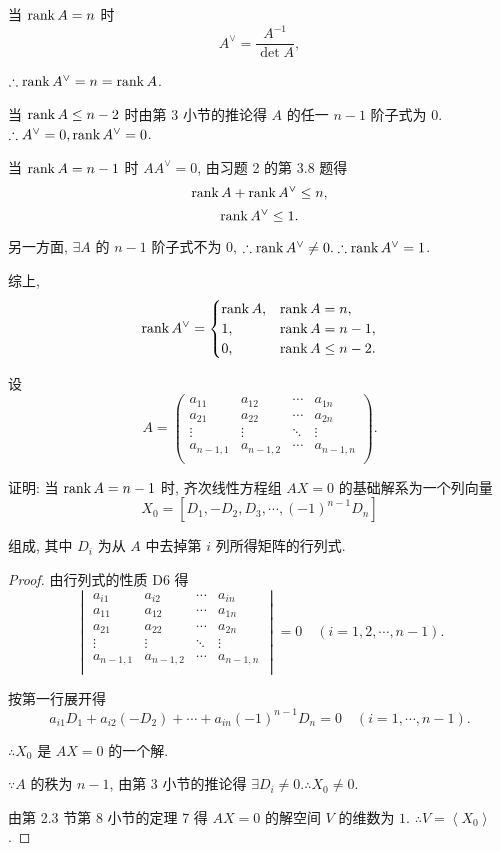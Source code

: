 \documentclass[color=black,device=normal,lang=cn,mode=geye]{elegantnote}
\begin{document}
\begin{solution}
    当 $\operatorname{rank} A=n$ 时
    \[A^\vee=\dfrac{A^{-1}}{\det A},\]

    $\therefore\operatorname{rank} A^\vee=n=\operatorname{rank} A$.

    当 $\operatorname{rank} A\leq n-2$ 时由第 3 小节的推论得 $A$ 的任一 $n-1$ 阶子式为 $0$. $\therefore A^\vee=0,\operatorname{rank} A^\vee=0$.

    当 $\operatorname{rank} A=n-1$ 时 $AA^\vee=0$, 由习题 2 的第 3.8 题得
    \[\operatorname{rank} A+\operatorname{rank} A^\vee\leq n,\]
    \[\operatorname{rank} A^\vee\leq1.\]

    另一方面, $\exists A$ 的 $n-1$ 阶子式不为 $0$, $\therefore\operatorname{rank} A^\vee\neq0.\therefore\operatorname{rank} A^\vee=1$.

    综上,
    \[\operatorname{rank} A^\vee=\begin{cases}
        \operatorname{rank} A, & \operatorname{rank} A=n, \\
        1, & \operatorname{rank} A=n-1, \\
        0, & \operatorname{rank} A\leq n-2. \\
    \end{cases}\]
\end{solution}
\begin{exercise}\label{ex3.4}
    设
    \[A=\begin{pmatrix}
        a_{11} & a_{12} & \cdots & a_{1n} \\
        a_{21} & a_{22} & \cdots & a_{2n} \\
        \vdots & \vdots & \ddots & \vdots \\
        a_{n-1,1} & a_{n-1,2} & \cdots & a_{n-1,n} \\
    \end{pmatrix}.\]

    证明: 当 $\operatorname{rank} A=n-1$ 时, 齐次线性方程组 $AX=0$ 的基础解系为一个列向量
    \[X_0=[D_1,-D_2,D_3,\cdots,(-1)^{n-1}D_n]\]

    组成, 其中 $D_i$ 为从 $A$ 中去掉第 $i$ 列所得矩阵的行列式.
\end{exercise}
\begin{proof}
    由行列式的性质 D6 得
    \[\begin{vmatrix}
        a_{i1} & a_{i2} & \cdots & a_{in} \\
        a_{11} & a_{12} & \cdots & a_{1n} \\
        a_{21} & a_{22} & \cdots & a_{2n} \\
        \vdots & \vdots & \ddots & \vdots \\
        a_{n-1,1} & a_{n-1,2} & \cdots & a_{n-1,n} \\
    \end{vmatrix}=0\quad(i=1,2,\cdots,n-1).\]

    按第一行展开得
    \[a_{i1}D_1+a_{i2}(-D_2)+\cdots+a_{in}(-1)^{n-1}D_n=0\quad(i=1,\cdots,n-1).\]

    $\therefore X_0$ 是 $AX=0$ 的一个解.

    $\because A$ 的秩为 $n-1$, 由第 3 小节的推论得 $\exists D_i\neq0.\therefore X_0\neq0$.

    由第 2.3 节第 8 小节的定理 7 得 $AX=0$ 的解空间 $V$ 的维数为 $1$. $\therefore V=\left<X_0\right>$.
\end{proof}
\end{document}
